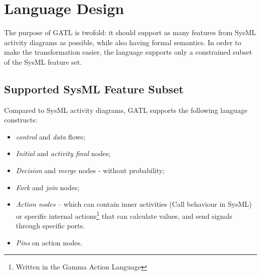 \section{Language Design}

The purpose of GATL is twofold: it should support as many features from SysML activity diagrams as possible, while also having formal semantics. In order to make the transformation easier, the language supports only a constrained subset of the SysML feature set.

\subsection{Supported SysML Feature Subset}

Compared to SysML activity diagrams, GATL supports the following language constructs:

\begin{itemize}
	\item \emph{control} and \emph{data} flows;
	\item \emph{Initial} and \emph{activity final} nodes;
	\item \emph{Decision} and \emph{merge} nodes - without probability;
	\item \emph{Fork} and \emph{join} nodes;
	\item \emph{Action nodes} -- which can contain inner activities (Call behaviour in SysML) or specific internal actions\footnote{Written in the Gamma Action Language} that can calculate values, and send signals through specific ports.
	\item \emph{Pins} on action nodes.
\end{itemize}
